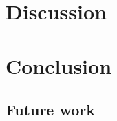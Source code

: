 





\section{Discussion}\label{sec:paper-discussion}




\section{Conclusion}\label{sec:paper-conclusion}

\subsection{Future work}
